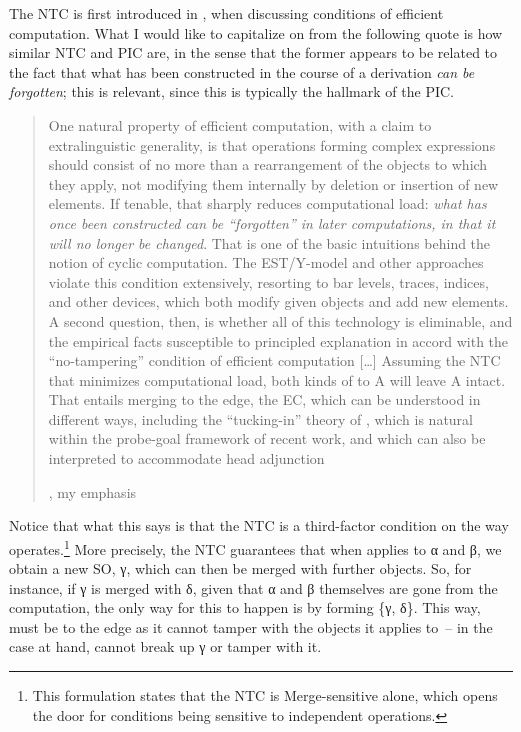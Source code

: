 \documentclass[output=paper]{langsci/langscibook}
\begin{document}
The \gls{NTC} is first introduced in \citet{Chomsky2005}, when discussing
conditions of efficient computation. What I would like to capitalize on from
the following quote is how similar \gls{NTC} and \gls{PIC} are, in the sense
that the former appears to be related to the fact that what has been
constructed in the course of a derivation \emph{can be forgotten}; this is
relevant, since this is typically the hallmark of the \gls{PIC}.

\blockquote[{\citealt[11, 13]{Chomsky2005}, my emphasis}][.]{One natural
    property of efficient computation, with a claim to extralinguistic
    generality, is that operations forming complex expressions should consist
    of no more than a rearrangement of the objects to which they apply, not
    modifying them internally by deletion or insertion of new elements. If
    tenable, that sharply reduces computational load: \emph{what has once
    been constructed can be ``forgotten'' in later computations, in that it
will no longer be changed}.  That is one of the basic intuitions behind the
notion of cyclic computation.  The \gls{EST}/Y-model and other
approaches violate this condition extensively, resorting to bar levels, traces,
indices, and other devices, which both modify given objects and add new
elements. A second question, then, is whether all of this technology is
eliminable, and the empirical facts susceptible to principled explanation in
accord with the ``no-tampering'' condition of efficient computation [\dots]
Assuming the \gls{NTC} that minimizes computational load, both kinds of 
to A will leave A intact. That entails merging to the edge, the \gls{EC}, which
can be understood in different ways, including the ``tucking-in'' theory of
\textcite{Richards1997}, which is natural within the probe-goal framework of
recent work, and which can also be interpreted to accommodate head
adjunction}

Notice that what this says is that the \gls{NTC} is a third-factor condition on the
way  operates.\footnote{This formulation states that the \gls{NTC} is
Merge-sensitive alone, which opens the door for conditions being sensitive to
independent operations.}  More precisely, the \gls{NTC} guarantees that when 
applies to α and β, we obtain a new \gls{SO}, γ, which can
then be merged with further objects. So, for instance, if γ is merged
with δ, given that α and β themselves are gone from
the computation, the only way for this to happen is by forming \{γ, δ\}. This
way,  must be to the edge as it cannot tamper with the objects it
applies to~-- in the case at hand,  cannot break up γ or tamper with
it.
\end{document}
